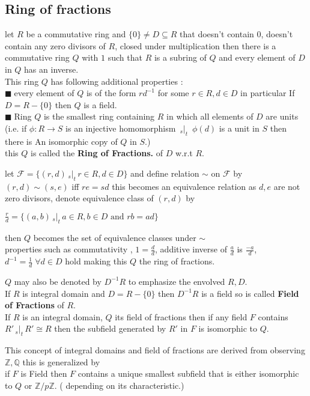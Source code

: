 \documentclass[11pt]{extarticle}
\newcommand{\ra}{\rightarrow}
\newcommand{\Z}{\mathbb{Z}}
\newcommand{\Q}{\mathbb{Q}}
\newcommand{\w}[1]{\text{#1}}
\newcommand{\snote}[1]{{\footnotesize(#1)}}
\newcommand{\st}{\,{}_{s}|_t\,}
\newcommand{\tbx}[2][]{
	\begin{tcolorbox}[enhanced,breakable,size=small,colback=black!2!white,title={#1},arc is angular, arc=1.5mm,drop fuzzy shadow]
		#2
	\end{tcolorbox}
}
\newcommand{\y}{$\blacksquare\;$}
\begin{document}
\begin{multicols}{2}
		\section{Ring of fractions} 

\tbx{let $ R $ be a commutative ring and $ \{0\}\neq D\subseteq R $ that doesn't contain $ 0 $, doesn't contain any zero divisors of $ R $, closed under multiplication then there is a commutative ring $ Q $ with $ 1 $ such that 
			$ R $ is a subring of $  Q$ and every element of $ D $ in $ Q $ has an inverse.\\
			This ring $ Q $ has  following additional properties :\\
			\y every element of $ Q $ is of the form $ rd^{-1} $ for some $ r\in R, d\in D $ in particular If 
			$ D=R-\{0\} $ then $ Q $ is a field.\\
			\y Ring $ Q $ is the smallest ring containing $ R $ in which all elements of $ D $ are units \\
			\snote{i.e. if $ \phi : R\ra S $ is an injective homomorphism $ \st $ $ \phi(d) $ is a unit in 
				$ S $ then there is An isomorphic copy of $ Q $ in $ S .$}\\
			this $ Q $ is called the \textbf{Ring of Fractions.} of $ D $ w.r.t $ R. $
			} 
\tbx[Construction of Ring of fractions ]{
			let $ \mathcal{ F} = \{ (r,d) \st r\in R, d\in D \}$ and define relation $ \sim $ on 
			$ \mathcal{ F} $ by $ (r,d)\sim (s,e) $ iff $ re=sd $ this becomes an equivalence relation as 
			$d,e$ are not zero divisors, denote equivalence class of $ (r,d) $ by 
			\begin{center}
				$\frac{ r}{  d}=\{ (a,b)\st a\in R, b\in D \w{ and } rb=ad\} $ 
			\end{center}
			then $ Q $ becomes the set of equivalence classes under $ \sim $ \\
			properties such as commutativity , $1= \frac{ d}{d  }$, additive inverse of $ \frac{ a}{  d} $
			is $ \frac{ -a}{  d} $, $ d^{-1}= \frac{ 1}{  d} \; \forall d\in D$ hold making this $ Q $ the 
			ring of fractions.
			} 
\tbx{$ Q $ may also be denoted by $ D^{-1}R $ to emphasize the envolved $ R,D .$\\
If $ R $ is integral domain and $ D=R-\{0\} $ then $ D^{-1}R $ is a field so is called 
			\textbf{ Field of Fractions} of $ R .$\\
If $ R$ is an integral domain, $ Q $ its field of fractions then if any field $ F $ contains
			$ R' \st R'\cong R $ then the subfield generated by $ R' $ in $ F $ is isomorphic to $ Q. $
			} 
\tbx{This concept of integral domains and field of fractions are derived from observing $ \Z,\Q $
			this is generalized by\\
			if $ F $ is Field then $ F $ contains a unique smallest subfield that is either isomorphic to 
			$Q $ or $ \Z/p\Z .$ \snote{ depending on its characteristic.}}
			

\end{multicols}
\end{document}
